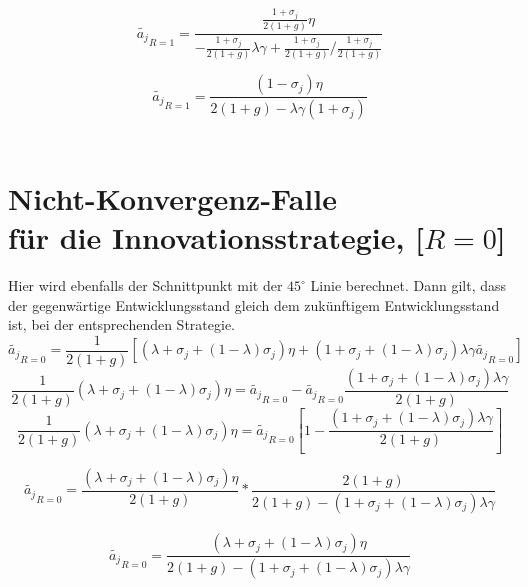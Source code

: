 \begin{equation}
\tilde{a_j}_{R=1}= \frac{\frac{1+\sigma_j}{2(1+g)}\eta}{-\frac{1+\sigma_j}{2(1+g)}\lambda\gamma+\frac{1+\sigma_j}{2(1+g)}/\frac{1+\sigma_j}{2(1+g)}}
\end{equation}

\begin{equation}
\boxed{\tilde{a_j}_{R=1}=\frac{(1-\sigma_j)\eta}{2(1+g)-\lambda\gamma(1+\sigma_j)}}
\end{equation}
\\


\section[Nicht-Konvergenz-Falle für die Innovationsstrategie, ${[R=0]}$]{Nicht-Konvergenz-Falle \\ für die Innovations\-strategie, [$R=0$]}\label{NichtKonvergenzFalleInnovation}
Hier wird ebenfalls der Schnittpunkt mit der $45^\circ$ Linie berechnet. Dann gilt, dass der gegenwärtige Entwicklungsstand gleich dem zukünftigem Entwicklungsstand ist, bei der entsprechenden Strategie.
\begin{equation}
\tilde{a_j}_{R=0} =\frac{1}{2(1+g)}[(\lambda+\sigma_j+(1-\lambda)\sigma_j)\eta+(1+\sigma_j+(1-\lambda)\sigma_j)\lambda\gamma\tilde{a_j}_{R=0}]
\end{equation}
\begin{equation}
\frac{1}{2(1+g)}(\lambda+\sigma_j+(1-\lambda)\sigma_j)\eta = \tilde{a_j}_{R=0}-\tilde{a_j}_{R=0}\frac{(1+\sigma_j+(1-\lambda)\sigma_j)\lambda\gamma}{2(1+g)}
\end{equation}
\begin{equation}
\frac{1}{2(1+g)}(\lambda+\sigma_j+(1-\lambda)\sigma_j)\eta = \tilde{a_j}_{R=0}\left[1-\frac{(1+\sigma_j+(1-\lambda)\sigma_j)\lambda\gamma}{2(1+g)}\right]
\end{equation}

\begin{equation}
\tilde{a_j}_{R=0} = \frac{(\lambda+\sigma_j+(1-\lambda)\sigma_j)\eta}{2(1+g)}*\frac{2(1+g)}{2(1+g)-(1+\sigma_j+(1-\lambda)\sigma_j)\lambda\gamma}
\end{equation}
\\
\begin{equation}
\boxed{\tilde{a_j}_{R=0} = \frac{(\lambda+\sigma_j+(1-\lambda)\sigma_j)\eta}{2(1+g)-(1+\sigma_j+(1-\lambda)\sigma_j)\lambda\gamma}}
\end{equation}
\\


